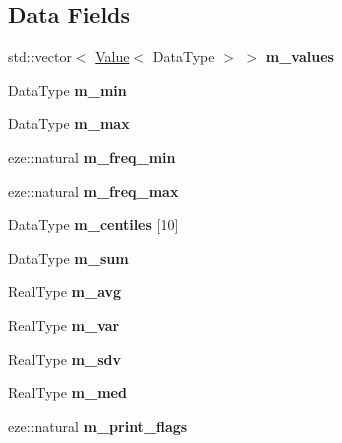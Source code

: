 \subsection*{Data Fields}
\begin{DoxyCompactItemize}
\item 
\mbox{\label{classez_1_1maths_1_1Statistics_ac5cc29318f54794c7d0df104d4d27fe0}} 
std\+::vector$<$ \hyperlink{classez_1_1maths_1_1Value}{Value}$<$ Data\+Type $>$ $>$ {\bfseries m\+\_\+values}
\item 
\mbox{\label{classez_1_1maths_1_1Statistics_aa87d4cb454663d23a372df4a9733ef6d}} 
Data\+Type {\bfseries m\+\_\+min}
\item 
\mbox{\label{classez_1_1maths_1_1Statistics_aa5198d48209e9de0ae02da3b78cecb0a}} 
Data\+Type {\bfseries m\+\_\+max}
\item 
\mbox{\label{classez_1_1maths_1_1Statistics_ac64a8b6142ce5aa84188a8f1f6c0007f}} 
eze\+::natural {\bfseries m\+\_\+freq\+\_\+min}
\item 
\mbox{\label{classez_1_1maths_1_1Statistics_a6ae8ee105c09bebe715ffe8ce81ad17d}} 
eze\+::natural {\bfseries m\+\_\+freq\+\_\+max}
\item 
\mbox{\label{classez_1_1maths_1_1Statistics_ae8875486a3cf7fd6f2c58832a1a70e89}} 
Data\+Type {\bfseries m\+\_\+centiles} \mbox{[}10\mbox{]}
\item 
\mbox{\label{classez_1_1maths_1_1Statistics_a3bd3659824061c27583d7b8907b0503f}} 
Data\+Type {\bfseries m\+\_\+sum}
\item 
\mbox{\label{classez_1_1maths_1_1Statistics_afc9e42d9fdc894b60733d31c2c845621}} 
Real\+Type {\bfseries m\+\_\+avg}
\item 
\mbox{\label{classez_1_1maths_1_1Statistics_ab842f1de265f4b2eebaf90f99df6f789}} 
Real\+Type {\bfseries m\+\_\+var}
\item 
\mbox{\label{classez_1_1maths_1_1Statistics_aed8408db4acb34a66782c8974e6ba112}} 
Real\+Type {\bfseries m\+\_\+sdv}
\item 
\mbox{\label{classez_1_1maths_1_1Statistics_aff2d7537cee12d47a8ba3c5c938b3a64}} 
Real\+Type {\bfseries m\+\_\+med}
\item 
\mbox{\label{classez_1_1maths_1_1Statistics_a32534f7ef8d0c5671858a0ffbf1839bf}} 
eze\+::natural {\bfseries m\+\_\+print\+\_\+flags}
\end{DoxyCompactItemize}
